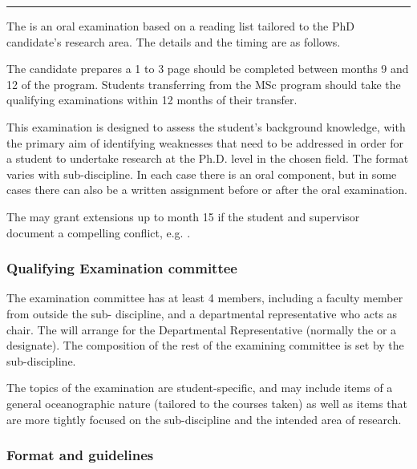 \hrule



\p The  is an oral examination based on a
reading list tailored to the PhD candidate's research area. The details and the
timing are as follows.

\p The candidate prepares a 1 to 3 page 
should be completed between months 9 and 12 of
the program.  Students transferring from the MSc program should take the
qualifying examinations within 12 months of their transfer.

\p This examination is designed to assess the student's background knowledge, with
the primary aim of identifying weaknesses that need to be addressed in order
for a student to undertake research at the Ph.D. level in the chosen field. The
format varies with sub-discipline. In each case there is an oral component, but
in some cases there can also be a written assignment before or after the oral
examination.

\p The \curcom  may grant extensions up to month 15 if the student and supervisor
document a compelling conflict, e.g. .
 

\subsubsection{Qualifying Examination committee}

\cp

\p The examination committee has at least 4 members, including a faculty member
from outside the sub- discipline, and a departmental representative who acts as
chair. The \GS will arrange for the Departmental Representative (normally the
\GC or a designate). The composition of the rest of the examining committee is
set by the sub-discipline.

\p The topics of the examination are student-specific, and may include items of a
general oceanographic nature (tailored to the courses taken) as well as items
that are more tightly focused on the sub-discipline and the intended area of
research.

\subsubsection{Format and guidelines}


